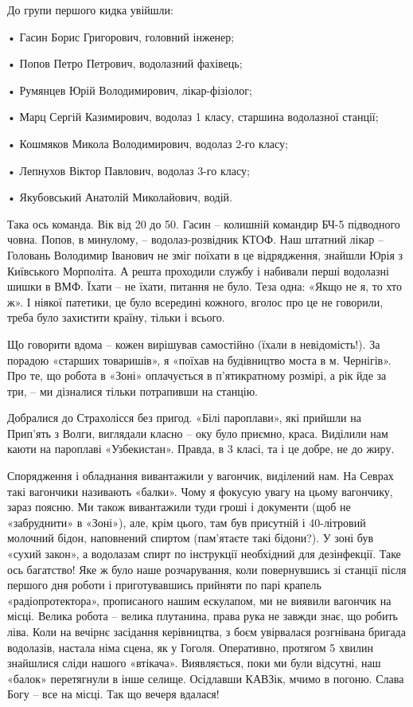 До групи першого кидка увійшли:

• Гасин Борис Григорович, головний інженер;

• Попов Петро Петрович, водолазний фахівець;

• Румянцев Юрій Володимирович, лікар-фізіолог;

• Марц Сергій Казимирович, водолаз 1 класу, старшина водолазної станції;

• Кошмяков Микола Володимирович, водолаз 2-го класу;

• Лепнухов Віктор Павлович, водолаз 3-го класу;

• Якубовський Анатолій Миколайович, водій.

Така ось команда. Вік від 20 до 50. Гасин – колишній командир БЧ-5 підводного
човна. Попов, в минулому, – водолаз-розвідник КТОФ. Наш штатний лікар –
Головань Володимир Іванович не зміг поїхати в це відрядження, знайшли Юрія з
Київського Морполіта. А решта проходили службу і набивали перші водолазні шишки
в ВМФ. Їхати – не їхати, питання не було. Теза одна: «Якщо не я, то хто ж». І
ніякої патетики, це було всередині кожного, вголос про це не говорили, треба
було захистити країну, тільки і всього.

Що говорити вдома – кожен вирішував самостійно (їхали в невідомість!). За
порадою «старших товаришів», я «поїхав на будівництво моста в м. Чернігів». Про
те, що робота в «Зоні» оплачується в п'ятикратному розмірі, а рік йде за три, –
ми дізналися тільки потрапивши на станцію.

Добралися до Страхолісся без пригод. «Білі пароплави», які прийшли на Прип'ять
з Волги, виглядали класно – оку було приємно, краса. Виділили нам каюти на
пароплаві «Узбекистан». Правда, в 3 класі, та і це добре, не до жиру.

Спорядження і обладнання вивантажили у вагончик, виділений нам. На Севрах такі
вагончики називають «балки». Чому я фокусую увагу на цьому вагончику, зараз
поясню. Ми також вивантажили туди гроші і документи (щоб не «забруднити» в
«Зоні»), але, крім цього, там був присутній і 40-літровий молочний бідон,
наповнений спиртом (пам'ятаєте такі бідони?). У зоні був «сухий закон», а
водолазам спирт по інструкції необхідний для дезінфекції. Таке ось багатство!
Яке ж було наше розчарування, коли повернувшись зі станції після першого дня
роботи і приготувавшись прийняти по парі крапель «радіопротектора», прописаного
нашим ескулапом, ми не виявили вагончик на місці. Велика робота – велика
плутанина, права рука не завжди знає, що робить ліва. Коли на вечірнє засідання
керівництва, з боєм увірвалася розгнівана бригада водолазів, настала німа
сцена, як у Гоголя. Оперативно, протягом 5 хвилин знайшлися сліди нашого
«втікача». Виявляється, поки ми були відсутні, наш «балок» перетягнули в інше
селище. Осідлавши КАВЗік, мчимо в погоню. Слава Богу – все на місці. Так що
вечеря вдалася!

